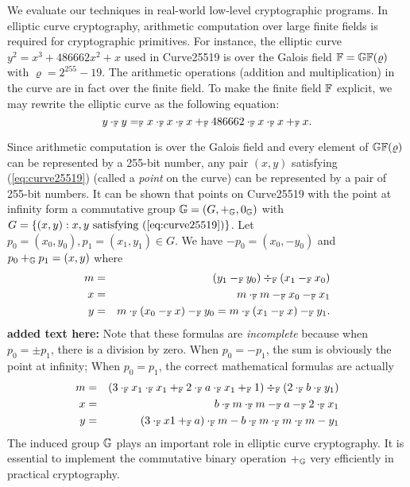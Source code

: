 
We evaluate our techniques in real-world low-level cryptographic
programs. In elliptic curve cryptography, arithmetic computation over
large finite fields is required for cryptographic primitives. For
instance, the elliptic curve $y^2 = x^3 + 486662 x^2 + x$ used in 
Curve25519 is over the Galois field $\mathbb{F} = \mathbb{GF}(\varrho)$ with
$\varrho = 2^{255} - 19$. The arithmetic operations (addition and
multiplication) in the curve are in fact over the finite field. To
make the finite field $\mathbb{F}$ explicit, we may rewrite the elliptic
curve as the following equation: 
\begin{equation}
  \label{eq:curve25519}
  y \cdot_{\mathbb{F}} y =_{\mathbb{F}} x \cdot_{\mathbb{F}} x \cdot_{\mathbb{F}} x +_{\mathbb{F}}
  486662 \cdot_{\mathbb{F}} x \cdot_{\mathbb{F}} x +_{\mathbb{F}} x.
\end{equation}

Since arithmetic computation is over the Galois field and every
element of $\mathbb{GF}(\varrho)$ can be represented by a 255-bit number,
any pair $(x, y)$ satisfying (\ref{eq:curve25519}) (called a
\emph{point} on the curve) can be represented by a pair of 255-bit
numbers. It can be shown that points on Curve25519 with the point at
infinity form a commutative group $\mathbb{G} = (G, +_{\mathbb{G}}, 0_{\mathbb{G}})$
with $G = \{ (x, y) : x, y \textmd{ satisfying } (\ref{eq:curve25519})
\}$. Let $p_0 = (x_0, y_0), p_1 = (x_1, y_1) \in G$. We have $-p_0 =
(x_0, -y_0)$ and $p_0 +_{\mathbb{G}} p_1 = (x, y)$ where
\begin{eqnarray}
  m & = & (y_1 -_{\mathbb{F}} y_0) \div_{\mathbb{F}} (x_1 -_{\mathbb{F}} x_0)\\\nonumber
  x & = & m \cdot_{\mathbb{F}} m -_{\mathbb{F}} x_0 -_{\mathbb{F}} x_1\\ \nonumber
  y & = & m \cdot_{\mathbb{F}} (x_0 -_{\mathbb{F}} x) -_{\mathbb{F}} y_0 
     = m \cdot_{\mathbb{F}} (x_1 -_{\mathbb{F}} x) -_{\mathbb{F}} y_1.
  \label{eq:curve25519-group}
\end{eqnarray}
\textbf{added text here:}
% 
Note that these formulas are \emph{incomplete} because when
$p_0=\pm p_1$, there is a division by zero.  When $p_0=-p_1$, the sum is obviously the point at  infinity;  When $p_0= p_1$, the
correct mathematical formulas are actually
\begin{eqnarray}
  \label{eq:curve25519-dbl}
  m &=& (3  \cdot_{\mathbb{F}} x_1 \cdot_{\mathbb{F}} x_1 +_{\mathbb{F}} 2\cdot_{\mathbb{F}} a\cdot_{\mathbb{F}} x_1+_{\mathbb{F}} 1) 
        \div_{\mathbb{F}} (2\cdot_{\mathbb{F}} b\cdot_{\mathbb{F}} y_1) \\ \nonumber
   x &=& b \cdot_{\mathbb{F}} m \cdot_{\mathbb{F}} m -_{\mathbb{F}} a -_{\mathbb{F}} 2 \cdot_{\mathbb{F}} x_1 \\ \nonumber
   y &=& (3 \cdot_{\mathbb{F}} x1+_{\mathbb{F}} a) \cdot_{\mathbb{F}} m -b \cdot_{\mathbb{F}} m \cdot_{\mathbb{F}} m \cdot_{\mathbb{F}} m-y_1
\end{eqnarray}
%
The induced group $\mathbb{G}$
plays an important role in elliptic curve cryptography. It is
essential to implement the commutative binary operation $+_{\mathbb{G}}$ very
efficiently in practical cryptography.


